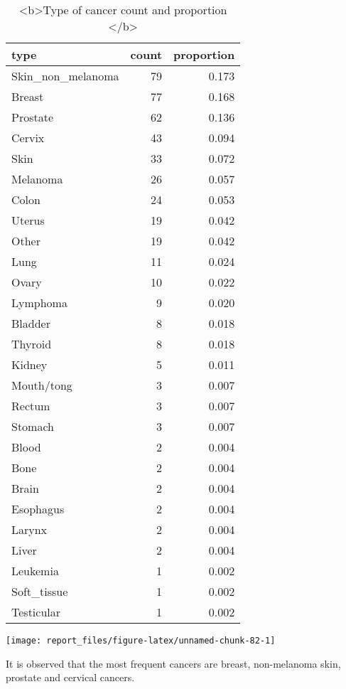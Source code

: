 \documentclass[
]{article}
\begin{document}
\begin{table}

\caption{\label{tab:unnamed-chunk-82}<b>Type of cancer count and proportion </b>}
\centering
\begin{tabular}[t]{l|r|r}
\hline
type & count & proportion\\
\hline
Skin\_non\_melanoma & 79 & 0.173\\
\hline
Breast & 77 & 0.168\\
\hline
Prostate & 62 & 0.136\\
\hline
Cervix & 43 & 0.094\\
\hline
Skin & 33 & 0.072\\
\hline
Melanoma & 26 & 0.057\\
\hline
Colon & 24 & 0.053\\
\hline
Uterus & 19 & 0.042\\
\hline
Other & 19 & 0.042\\
\hline
Lung & 11 & 0.024\\
\hline
Ovary & 10 & 0.022\\
\hline
Lymphoma & 9 & 0.020\\
\hline
Bladder & 8 & 0.018\\
\hline
Thyroid & 8 & 0.018\\
\hline
Kidney & 5 & 0.011\\
\hline
Mouth/tong & 3 & 0.007\\
\hline
Rectum & 3 & 0.007\\
\hline
Stomach & 3 & 0.007\\
\hline
Blood & 2 & 0.004\\
\hline
Bone & 2 & 0.004\\
\hline
Brain & 2 & 0.004\\
\hline
Esophagus & 2 & 0.004\\
\hline
Larynx & 2 & 0.004\\
\hline
Liver & 2 & 0.004\\
\hline
Leukemia & 1 & 0.002\\
\hline
Soft\_tissue & 1 & 0.002\\
\hline
Testicular & 1 & 0.002\\
\hline
\end{tabular}
\end{table}

\begin{center}\texttt{[image: report\_files/figure-latex/unnamed-chunk-82-1]} \end{center}

It is observed that the most frequent cancers are breast, non-melanoma
skin, prostate and cervical cancers.
\end{document}
